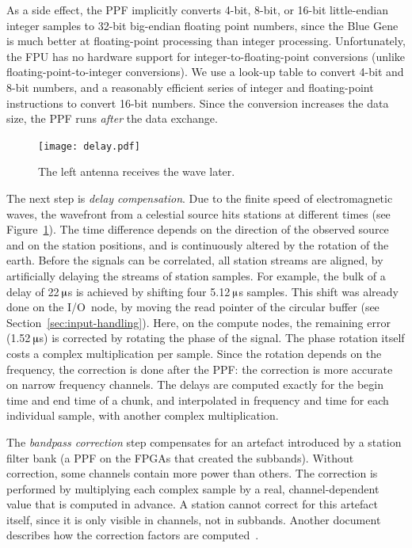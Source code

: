 \documentclass{sig-alternate}
\newcommand{\us}{\,$\muup$s\xspace}
\begin{document}
As a side effect, the PPF implicitly converts 4-bit, 8-bit, or 16-bit
little-endian integer samples to 32-bit big-endian floating point numbers,
since the Blue Gene is much better at floating-point processing than integer
processing.
Unfortunately, the FPU has no hardware support for integer-to-floating-point
conversions (unlike floating-point-to-integer conversions).
We use a look-up table to convert 4-bit and 8-bit numbers, and a reasonably
efficient series of integer and floating-point instructions to convert 16-bit
numbers.
Since the conversion increases the data size, the PPF runs \emph{after\/} the
data exchange.


\begin{figure}[ht]
\begin{center}
\texttt{[image: delay.pdf]}
\end{center}
\caption{The left antenna receives the wave later.}
\label{fig:delay}
\end{figure}

The next step is \emph{delay compensation}.
Due to the finite speed of electromagnetic waves, the wavefront from a celestial source hits
stations at different times (see Figure~\ref{fig:delay}).
The time difference depends on the direction of the observed source and on the
station positions, and is continuously altered by the rotation of the earth.
Before the signals can be correlated, all station streams are aligned,
by artificially delaying the streams of station samples.
For example, the bulk of a delay of 22\us is achieved by shifting four 5.12\us
samples.
This shift was already done on the I/O~node, by moving the read pointer
of the circular buffer (see Section~\ref{sec:input-handling}).
Here, on the compute nodes, the remaining error (1.52\us) is corrected by
rotating the phase of the signal.
The phase rotation itself costs a complex multiplication per sample.
Since the rotation depends on the frequency, the correction is done after 
the PPF: the correction is more accurate on narrow frequency channels.
The delays are computed exactly for the begin time and end time of a chunk,
and interpolated in frequency and time for each individual sample, with
another complex multiplication.

The \emph{bandpass correction} step compensates for an artefact
introduced by a station filter bank (a PPF on the FPGAs that created the subbands).
Without correction, some channels contain more power than others.
The correction is performed by multiplying each complex sample by a real,
channel-dependent value that is computed in advance.
A station cannot correct for this artefact itself, since it is only visible
in channels, not in subbands.
Another document describes how the correction factors are
computed~\cite{Romein:08}.
\end{document}
